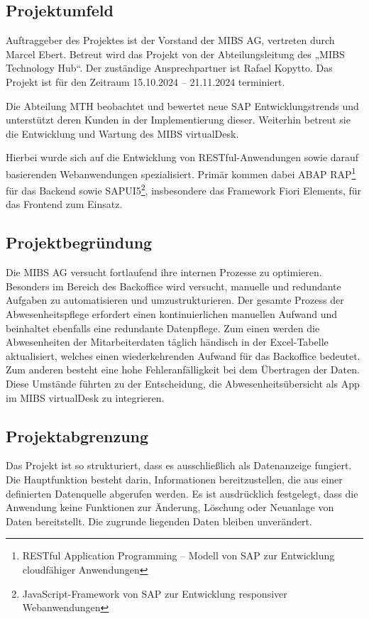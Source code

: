 \subsection{Projektumfeld}
\label{sec:Projektumfeld}
Auftraggeber des Projektes ist der Vorstand der MIBS AG, vertreten durch Marcel Ebert. Betreut wird das Projekt von der Abteilungsleitung des „MIBS Technology Hub“. Der zuständige Ansprechpartner ist Rafael Kopytto. Das Projekt ist für den Zeitraum 15.10.2024 – 21.11.2024 terminiert.

Die Abteilung MTH beobachtet und bewertet neue SAP Entwicklungstrends und unterstützt deren Kunden in der Implementierung dieser. Weiterhin betreut sie die Entwicklung und Wartung des MIBS virtualDesk.


Hierbei wurde sich auf die Entwicklung von RESTful-Anwendungen sowie darauf basierenden Webanwendungen spezialisiert. Primär kommen dabei ABAP RAP\footnote{\label{RAP}RESTful Application Programming – Modell von SAP zur Entwicklung cloudfähiger Anwendungen} für das Backend sowie SAPUI5\footnote{\label{fn:UI5}JavaScript-Framework von SAP zur Entwicklung responsiver Webanwendungen}, insbesondere das Framework Fiori Elements, für das Frontend zum Einsatz. 


\subsection{Projektbegründung}
\label{sec:Projektbegründung}
Die MIBS AG versucht fortlaufend ihre internen Prozesse zu optimieren. Besonders im Bereich des Backoffice wird versucht, manuelle und redundante Aufgaben zu automatisieren und umzustrukturieren. Der gesamte Prozess der Abwesenheitspflege erfordert einen kontinuierlichen manuellen Aufwand und beinhaltet ebenfalls eine redundante Datenpflege. Zum einen werden die Abwesenheiten der Mitarbeiterdaten täglich händisch in der Excel-Tabelle aktualisiert, welches einen wiederkehrenden Aufwand für das Backoffice bedeutet. Zum anderen besteht eine hohe Fehleranfälligkeit bei dem Übertragen der Daten.
Diese Umstände führten zu der Entscheidung, die Abwesenheitsübersicht als App im MIBS virtualDesk zu integrieren.

\subsection{Projektabgrenzung}
\label{sec:Projektabgrenzung}
Das Projekt ist so strukturiert, dass es ausschließlich als Datenanzeige fungiert. Die Hauptfunktion besteht darin, Informationen bereitzustellen, die aus einer definierten Datenquelle abgerufen werden. Es ist ausdrücklich festgelegt, dass die Anwendung keine Funktionen zur Änderung, Löschung oder Neuanlage von Daten bereitstellt. Die zugrunde liegenden Daten bleiben unverändert.

